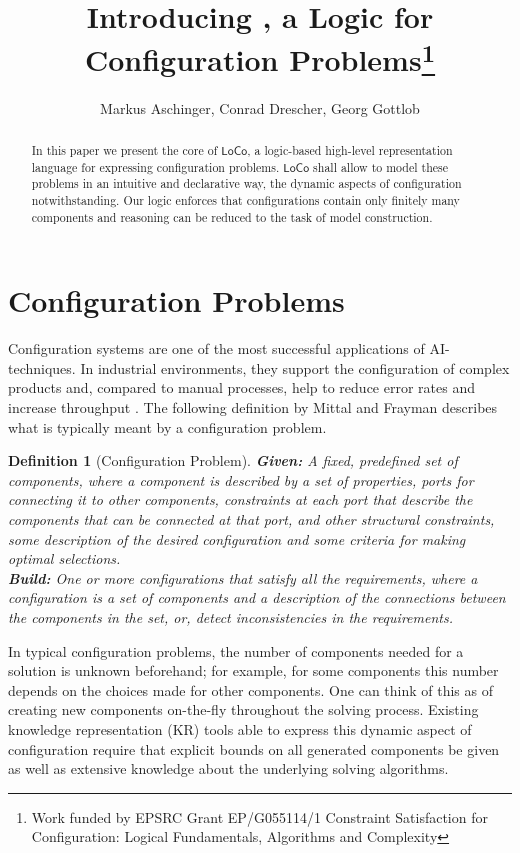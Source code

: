 \documentclass[copyright,creativecommons]{eptcs}
\title{Introducing \LoCo, a Logic for Configuration Problems\thanks{Work funded by EPSRC Grant EP/G055114/1 Constraint Satisfaction for Configuration: Logical Fundamentals, Algorithms and Complexity}}
\author{Markus Aschinger, Conrad Drescher, Georg Gottlob
\institute{Department of Computer Science, University of Oxford}
\email{firstname.lastname@cs.ox.ac.uk}
}
\newcommand{\LoCo}{\ensuremath{\mathsf{LoCo}}\xspace}
\newtheorem{definition}{Definition}
\begin{document}
\maketitle

\begin{abstract}
In this paper we present the core of \LoCo, a logic-based high-level representation language for expressing configuration problems. 
\LoCo shall allow to model these problems in an intuitive and declarative way, the dynamic aspects of configuration notwithstanding. 
Our logic enforces that configurations contain only finitely many components and
reasoning can be reduced to the task of model construction.
\end{abstract}



\section{Configuration Problems}

Configuration systems are one of the most successful applications of AI-techniques. 
In industrial environments, they support the configuration of complex products and, compared to manual processes, help to reduce error rates and increase throughput \cite{sabin:survey}. 
The following definition by Mittal and Frayman \cite{mittal:generic_model} describes what is typically meant by a configuration problem. 

\begin{definition}[Configuration Problem]
\label{def:cp}
{\bf Given\/:} A fixed, predefined set of components, where a component is described by a set of properties, ports for connecting it to other components, constraints at each port that describe the components that can be connected at that port, and other structural constraints, some description of the desired configuration and some criteria for making optimal selections. \\
{\bf Build\/:}
One or more configurations that satisfy all the requirements, where a configuration is a set of components and a description of the connections between the components in the set, or, detect inconsistencies in the requirements. 
\label{def:conf}
\end{definition}

In typical configuration problems, the number of components needed for a solution is unknown beforehand;
for example, for some components this number depends on the choices made for other components. 
One can think of this as of creating new components on-the-fly throughout the solving process. 
Existing knowledge representation (KR) tools able to express this dynamic aspect of configuration
require that explicit bounds on all generated components be given as well as
extensive knowledge about the underlying solving algorithms. 
\end{document}
